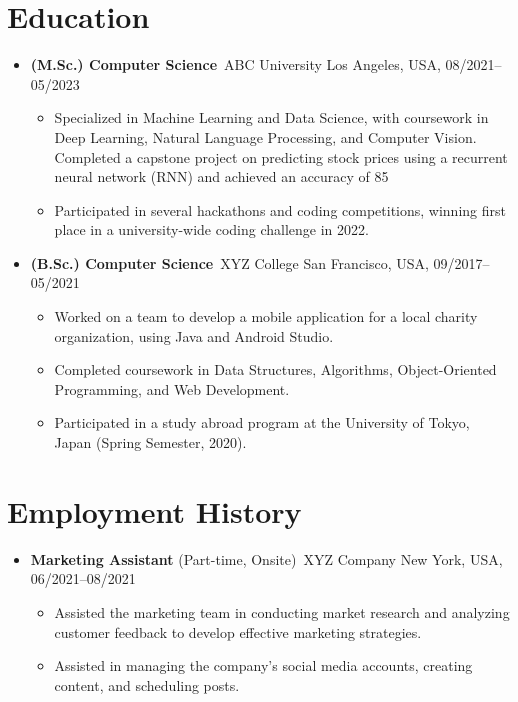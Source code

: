 \documentclass[a4paper,10pt]{article} %
\begin{document}
\section*{Education}

\begin{itemize}[leftmargin=*]
    \item \textbf{(M.Sc.) Computer Science}\
          ABC University \hfill Los Angeles, USA, 08/2021–05/2023
          \begin{itemize}
              \item[\textbullet] Specialized in Machine Learning and Data Science, with coursework in Deep Learning, Natural Language Processing, and Computer Vision. Completed a capstone project on predicting stock prices using a recurrent neural network (RNN) and achieved an accuracy of 85%
              \item[\textbullet] Participated in several hackathons and coding competitions, winning first place in a university-wide coding challenge in 2022.
          \end{itemize}
    \item \textbf{(B.Sc.) Computer Science}\
          XYZ College \hfill San Francisco, USA, 09/2017–05/2021
          \begin{itemize}
              \item[\textbullet] Worked on a team to develop a mobile application for a local charity organization, using Java and Android Studio.
              \item[\textbullet] Completed coursework in Data Structures, Algorithms, Object-Oriented Programming, and Web Development.
              \item[\textbullet] Participated in a study abroad program at the University of Tokyo, Japan (Spring Semester, 2020).
          \end{itemize}
\end{itemize}

\section*{Employment History}

\begin{itemize}[leftmargin=*]
    \item \textbf{Marketing Assistant} (Part-time, Onsite)\ XYZ Company \hfill New York, USA, 06/2021–08/2021
          \begin{itemize}
              \item[\textbullet] Assisted the marketing team in conducting market research and analyzing customer feedback to develop effective marketing strategies.
              \item[\textbullet] Assisted in managing the company's social media accounts, creating content, and scheduling posts.
          \end{itemize}
\end{itemize}
\end{document}
